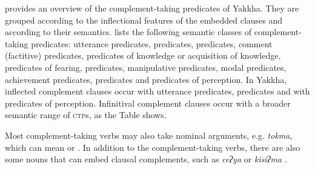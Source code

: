  provides an overview of the complement-taking predicates of Yakkha. They are grouped according to the  inflectional features of the embedded clauses and according to their semantics.  \citet[120]{Noonan2007Complementation} lists the following semantic classes of complement-taking predicates: utterance predicates,  predicates,  predicates, comment (factitive) predicates, predicates of knowledge or acquisition of knowledge, predicates of fearing,  predicates, manipulative predicates, modal predicates, achievement predicates,  predicates and predicates of perception. In Yakkha, inflected complement clauses occur with utterance predicates,  predicates and  with predicates of perception. Infinitival  complement clauses occur with a broader semantic range of \textsc{ctp}s, as the Table shows. 

Most complement-taking verbs may also take nominal arguments, e.g. \emph{tokma}, which can mean  or . In addition to the complement-taking verbs, there are also some nouns that can embed clausal complements, such as \emph{ceʔya}  or \emph{kisiʔma} . 


